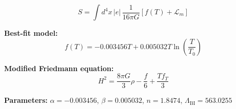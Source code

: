 
\begin{equation}
  S = \int d^4x \, |e| \, \frac{1}{16\pi G} \left[ f(T) + \mathcal{L}_m \right]
\end{equation}

\textbf{Best-fit model:}
\begin{equation}
  f(T) = -0.003456 T + 0.005032 T \ln\!\left(\frac{T}{T_0}\right)
\end{equation}

\textbf{Modified Friedmann equation:}
\begin{equation}
  H^2 = \frac{8\pi G}{3} \rho - \frac{f}{6} + \frac{T f_T}{3}
\end{equation}

\textbf{Parameters:}
$\alpha = -0.003456$, \quad
$\beta = 0.005032$, \quad
$n = 1.8474$, \quad
$\Lambda_{\text{BI}} = 563.0255$